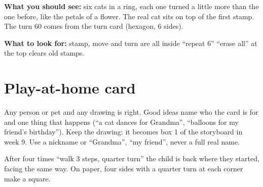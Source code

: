 \begin{answer}
\textbf{What you should see:} six cats in a ring, each one turned a little more than the one before, like the petals of a flower. The real cat sits on top of the first stamp. The turn 60 comes from the turn card (hexagon, 6 sides).

\textbf{What to look for:} \tickbox{} stamp, move and turn are all inside \enquote{repeat 6} \quad \tickbox{} \enquote{erase all} at the top clears old stamps.
\end{answer}

\section{Play-at-home card}
\begin{answer}
Any person or pet and any drawing is right. Good ideas name who the card is for and one thing that happens (\enquote{a cat dances for Grandma}, \enquote{balloons for my friend's birthday}). Keep the drawing: it becomes box 1 of the storyboard in week 9. Use a nickname or \enquote{Grandma}, \enquote{my friend}, never a full real name.
\end{answer}

\begin{answer}
After four times \enquote{walk 3 steps, quarter turn} the child is back where they started, facing the same way. On paper, four sides with a quarter turn at each corner make a square.
\end{answer}
